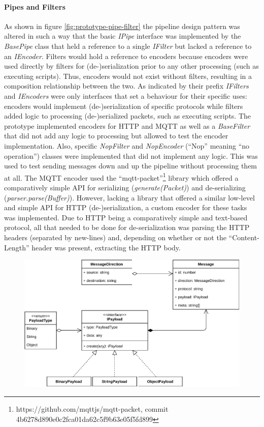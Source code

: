 \paragraph{Pipes and Filters} As shown in figure \ref{fig:prototype-pipe-filter} the pipeline design pattern was altered in such a way that the basic \emph{IPipe} interface was implemented by the \emph{BasePipe} class that held a reference to a single \emph{IFilter} but lacked a reference to an \emph{IEncoder}. Filters would hold a reference to encoders because encoders were used directly by filters for (de-)serialization prior to any other processing (such as executing scripts). Thus, encoders would not exist without filters, resulting in a composition relationship between the two. As indicated by their prefix \emph{IFilters} and \emph{IEncoders} were only interfaces that set a behaviour for their specific uses: encoders would implement (de-)serialization of specific protocols while filters added logic to processing (de-)serialized packets, such as executing scripts. The prototype implemented encoders for \ac{HTTP} and \ac{MQTT} as well as a \emph{BaseFilter} that did not add any logic to processing but allowed to test the encoder implementation. Also, specific \emph{NopFilter} and \emph{NopEncoder} (\enquote{Nop} meaning \enquote{no operation}) classes were implemented that did not implement any logic. This was used to test sending messages down and up the pipeline without processing them at all. The \ac{MQTT} encoder used the \enquote{mqtt-packet}\footnote{https://github.com/mqttjs/mqtt-packet, commit 4b6278d890e0c2fca01da62c5f9b63e05f5fd899} library which offered a comparatively simple API for serializing (\emph{generate(Packet)}) and de-serializing (\emph{parser.parse(Buffer)}). However, lacking a library that offered a similar low-level and simple API for \ac{HTTP} (de-)serialization, a custom encoder for these tasks was implemented. Due to \ac{HTTP} being a comparatively simple and text-based protocol, all that needed to be done for de-serialization was parsing the \ac{HTTP} headers (separated by new-lines) and, depending on whether or not the \enquote{Content-Length} header was present, extracting the \ac{HTTP} body.

\begin{figure}[h]
    \centering
    \includegraphics[width=14cm]{img/ch04/prototype/message-payload.pdf}
    \label{fig:prototype-message-payload}
\end{figure}
